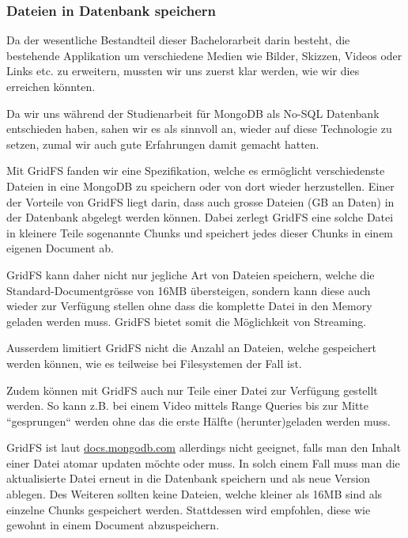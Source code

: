 \subsubsection{Dateien in Datenbank speichern}
Da der wesentliche Bestandteil dieser Bachelorarbeit darin besteht, die bestehende Applikation um verschiedene Medien wie Bilder, Skizzen, Videos oder Links etc. zu erweitern, mussten wir uns zuerst klar werden, wie wir dies erreichen könnten.

Da wir uns während der Studienarbeit für MongoDB als No-SQL Datenbank entschieden haben, sahen wir es als sinnvoll an, wieder auf diese Technologie zu setzen, zumal wir auch gute Erfahrungen damit gemacht hatten.

Mit GridFS\cite{gridfs-mongodb}\cite{gridfs-mongodb-async-driver} fanden wir eine Spezifikation, welche es ermöglicht verschiedenste Dateien in eine MongoDB zu speichern oder von dort wieder herzustellen. Einer der Vorteile von GridFS liegt darin, dass auch grosse Dateien (GB an Daten) in der Datenbank abgelegt werden können. Dabei zerlegt GridFS eine solche Datei in kleinere Teile sogenannte Chunks und speichert jedes dieser Chunks in einem eigenen Document ab\cite{gridfs-mongodb}.

GridFS kann daher nicht nur jegliche Art von Dateien speichern, welche die Standard-Documentgrösse von 16MB übersteigen, sondern kann diese auch wieder zur Verfügung stellen ohne dass die komplette Datei in den Memory geladen werden muss. GridFS bietet somit die Möglichkeit von Streaming\cite{gridfs-chunking}.

Ausserdem limitiert GridFS nicht die Anzahl an Dateien, welche gespeichert werden können, wie es teilweise bei Filesystemen der Fall ist.

Zudem können mit GridFS auch nur Teile einer Datei zur Verfügung gestellt werden. So kann z.B. bei einem Video mittels Range Queries bis zur Mitte ``gesprungen`` werden ohne das die erste Hälfte (herunter)geladen werden muss\cite{gridfs-mongodb}.

GridFS ist laut \href{https://docs.mongodb.com/manual/core/gridfs/}{docs.mongodb.com} allerdings nicht geeignet, falls man den Inhalt einer Datei atomar updaten möchte oder muss. In solch einem Fall muss man die aktualisierte Datei erneut in die Datenbank speichern und als neue Version ablegen.
Des Weiteren sollten keine Dateien, welche kleiner als 16MB sind als einzelne Chunks gespeichert werden. Stattdessen wird empfohlen, diese wie gewohnt in einem Document abzuspeichern.

